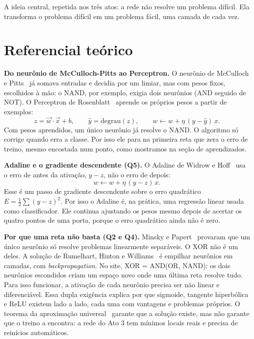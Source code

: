 \documentclass[11pt]{article}
\begin{document}
A ideia central, repetida nos três atos: a rede não resolve um problema difícil. Ela
transforma o problema difícil em um problema fácil, uma camada de cada vez.

\section{Referencial teórico}

\textbf{Do neurônio de McCulloch-Pitts ao Perceptron.} O neurônio de McCulloch e
Pitts~\cite{mcculloch1943logical} já somava entradas e decidia por um limiar, mas com pesos
fixos, escolhidos à mão: o NAND, por exemplo, exigia dois neurônios (AND seguido de NOT). O
Perceptron de Rosenblatt~\cite{rosenblatt1958perceptron} aprende os próprios pesos a partir de
exemplos:
$$z = \vec w \cdot \vec x + b, \qquad \hat y = \text{degrau}(z), \qquad w \leftarrow w + \eta\,(y-\hat y)\,x.$$
Com pesos aprendidos, um único neurônio já resolve o NAND. O algoritmo só corrige quando erra
a classe. Por isso ele para na primeira reta que zera o erro de treino, mesmo encostada num
ponto, como mostramos na seção de aprendizados.

\smallskip
\textbf{Adaline e o gradiente descendente (Q5).} O Adaline de Widrow e
Hoff~\cite{widrowhoff1960adaline} usa o erro de antes da ativação, $y - z$, não o erro de
depois:
$$w \leftarrow w + \eta\,(y - z)\,x.$$
Esse é um passo de gradiente descendente sobre o erro quadrático $E = \tfrac12\sum (y-z)^2$.
Por isso o Adaline é, na prática, uma regressão linear usada como classificador. Ele continua
ajustando os pesos mesmo depois de acertar os quatro pontos de uma porta, porque o erro
quadrático ainda não é zero.

\smallskip
\textbf{Por que uma reta não basta (Q2 e Q4).} Minsky e
Papert~\cite{minskypapert1969perceptrons} provaram que um único neurônio só resolve
problemas linearmente separáveis. O XOR não é um deles. A solução de Rumelhart, Hinton e
Williams~\cite{rumelhart1986backprop} é empilhar neurônios em camadas, com
\textit{backpropagation}. No site, XOR = AND(OR, NAND): os dois neurônios escondidos criam
um espaço novo onde uma última reta resolve tudo. Para isso funcionar, a ativação de cada
neurônio precisa ser não linear e diferenciável. Essa dupla exigência explica por que
sigmoide, tangente hiperbólica e ReLU existem lado a lado, cada uma com vantagens e problemas
próprios. O teorema da aproximação universal~\cite{cybenko1989approximation,hornik1991universal}
garante que a solução existe, mas não garante que o treino a encontra: a rede do Ato 3 tem
mínimos locais reais e precisa de reinícios automáticos.
\end{document}
